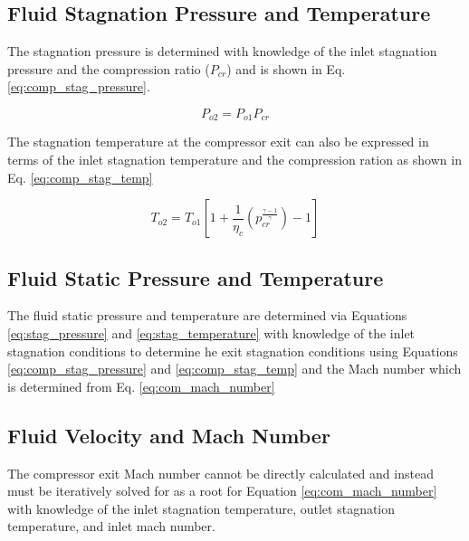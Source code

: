 \subsection{Fluid Stagnation Pressure and Temperature}
The stagnation pressure is determined with knowledge of the inlet stagnation pressure and the compression ratio ($P_{cr}$) and is
shown in Eq. \ref{eq:comp_stag_pressure}.

\begin{equation}
\label{eq:comp_stag_pressure}
P_{o2} = P_{o1}P_{cr}
\end{equation}

The stagnation temperature at the compressor exit can also be expressed in terms of the inlet stagnation temperature and the 
compression ration as shown in Eq. \ref{eq:comp_stag_temp}

\begin{equation}
\label{eq:comp_stag_temp}
T_{o2}=T_{o1}\left[1 + \frac{1}{\eta_c}\left(p_{cr}^{\frac{\gamma-1}{\gamma}}\right)-1\right]
\end{equation}

\subsection{Fluid Static Pressure and Temperature}
The fluid static pressure and temperature are determined via Equations \ref{eq:stag_pressure} and \ref{eq:stag_temperature} with knowledge of the 
inlet stagnation conditions to determine he exit stagnation conditions using Equations \ref{eq:comp_stag_pressure} and \ref{eq:comp_stag_temp} 
and the Mach number which is determined from Eq. \ref{eq:com_mach_number}

\subsection{Fluid Velocity and Mach Number}
The compressor exit Mach number cannot be directly calculated and instead must be iteratively solved for as a root for 
Equation \ref{eq:com_mach_number} with knowledge of the inlet stagnation temperature, outlet stagnation temperature, and inlet mach number.

